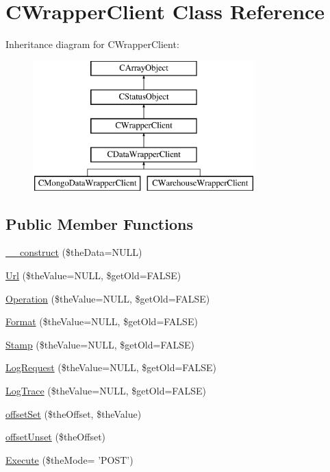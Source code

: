 \hypertarget{class_c_wrapper_client}{\section{C\-Wrapper\-Client Class Reference}
\label{class_c_wrapper_client}
}
Inheritance diagram for C\-Wrapper\-Client\-:\begin{figure}[H]
\begin{center}
\leavevmode
\includegraphics[height=5.000000cm]{class_c_wrapper_client}
\end{center}
\end{figure}
\subsection*{Public Member Functions}
\begin{DoxyCompactItemize}
\item 
\hyperlink{class_c_wrapper_client_a79e4150b435f337facf72119c289efbd}{\-\_\-\-\_\-construct} (\$the\-Data=N\-U\-L\-L)
\item 
\hyperlink{class_c_wrapper_client_ad8b041a29054f790a0a4fd65745da0ee}{Url} (\$the\-Value=N\-U\-L\-L, \$get\-Old=F\-A\-L\-S\-E)
\item 
\hyperlink{class_c_wrapper_client_ae378229fd57b051ddf0e0a7abf599641}{Operation} (\$the\-Value=N\-U\-L\-L, \$get\-Old=F\-A\-L\-S\-E)
\item 
\hyperlink{class_c_wrapper_client_aeea011893f53a7df495f23e199cbc28b}{Format} (\$the\-Value=N\-U\-L\-L, \$get\-Old=F\-A\-L\-S\-E)
\item 
\hyperlink{class_c_wrapper_client_ac87e4af5c32d735f192c8041e83b3ce3}{Stamp} (\$the\-Value=N\-U\-L\-L, \$get\-Old=F\-A\-L\-S\-E)
\item 
\hyperlink{class_c_wrapper_client_a844a2e677c1e0fb0855255cb02b86be4}{Log\-Request} (\$the\-Value=N\-U\-L\-L, \$get\-Old=F\-A\-L\-S\-E)
\item 
\hyperlink{class_c_wrapper_client_a2020117737285ff3c2c3f0fae01136ff}{Log\-Trace} (\$the\-Value=N\-U\-L\-L, \$get\-Old=F\-A\-L\-S\-E)
\item 
\hyperlink{class_c_wrapper_client_ac37ea353c211b696d11e103a069e8633}{offset\-Set} (\$the\-Offset, \$the\-Value)
\item 
\hyperlink{class_c_wrapper_client_af4a349c007923b1229f3099592660d97}{offset\-Unset} (\$the\-Offset)
\item 
\hyperlink{class_c_wrapper_client_a49dde8406fa42352792b99163f04c8c7}{Execute} (\$the\-Mode= 'P\-O\-S\-T')
\end{DoxyCompactItemize}
